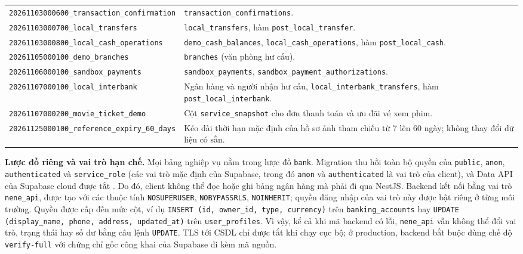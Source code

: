 \begin{longtable}{@{}>{\raggedright\arraybackslash}p{6.4cm}>{\raggedright\arraybackslash}p{8.0cm}@{}}
	\texttt{20261103000600\_\allowbreak transaction\_\allowbreak confirmation} & \texttt{transaction\_\allowbreak{}confirmations}.\\
	\texttt{20261103000700\_\allowbreak local\_transfers} & \texttt{local\_\allowbreak{}transfers}, hàm \texttt{post\_\allowbreak{}local\_\allowbreak{}transfer}.\\
	\texttt{20261103000800\_\allowbreak local\_cash\_operations} & \texttt{demo\_\allowbreak{}cash\_\allowbreak{}balances}, \texttt{local\_\allowbreak{}cash\_\allowbreak{}operations}, hàm \texttt{post\_\allowbreak{}local\_\allowbreak{}cash}.\\
	\texttt{20261105000100\_\allowbreak demo\_branches} & \texttt{branches} (văn phòng hư cấu).\\
	\texttt{20261106000100\_\allowbreak sandbox\_payments} & \texttt{sandbox\_\allowbreak{}payments}, \texttt{sandbox\_\allowbreak{}payment\_\allowbreak{}authorizations}.\\
	\texttt{20261107000100\_\allowbreak local\_interbank} & Ngân hàng và người nhận hư cấu, \texttt{local\_\allowbreak{}interbank\_\allowbreak{}transfers}, hàm \texttt{post\_\allowbreak{}local\_\allowbreak{}interbank}.\\
	\texttt{20261107000200\_\allowbreak movie\_ticket\_demo} & Cột \texttt{service\_\allowbreak{}snapshot} cho đơn thanh toán và ưu đãi vé xem phim.\\
	\texttt{20261125000100\_\allowbreak reference\_expiry\_60\_days} & Kéo dài thời hạn mặc định của hồ sơ ảnh tham chiếu từ 7 lên 60 ngày; không thay đổi dữ liệu có sẵn.\\
\end{longtable}
\endgroup

\textbf{Lược đồ riêng và vai trò hạn chế.} Mọi bảng nghiệp vụ nằm trong lược đồ \texttt{bank}. Migration thu hồi toàn bộ quyền của \texttt{public}, \texttt{anon}, \texttt{authenticated} và \texttt{service\_\allowbreak{}role} (các vai trò mặc định của Supabase, trong đó \texttt{anon} và \texttt{authenticated} là vai trò của client), và Data API của Supabase cloud được tắt \parencite{ch3-supabase-data-api}. Do đó, client không thể đọc hoặc ghi bảng ngân hàng mà phải đi qua NestJS. Backend kết nối bằng vai trò \texttt{nene\_\allowbreak{}api}, được tạo với các thuộc tính \texttt{NOSUPERUSER}, \texttt{NOBYPASSRLS}, \texttt{NOINHERIT}; quyền đăng nhập của vai trò này được bật riêng ở từng môi trường. Quyền được cấp đến mức cột, ví dụ \texttt{INSERT (id, owner\_\allowbreak{}id, type, currency)} trên \texttt{banking\_\allowbreak{}accounts} hay \texttt{UPDATE (display\_\allowbreak{}name, phone, address, updated\_\allowbreak{}at)} trên \texttt{user\_\allowbreak{}profiles}. Vì vậy, kể cả khi mã backend có lỗi, \texttt{nene\_\allowbreak{}api} vẫn không thể đổi vai trò, trạng thái hay số dư bằng câu lệnh \texttt{UPDATE}. TLS tới CSDL chỉ được tắt khi chạy cục bộ; ở production, backend bắt buộc dùng chế độ \texttt{verify-\allowbreak{}full} với chứng chỉ gốc công khai của Supabase đi kèm mã nguồn.

